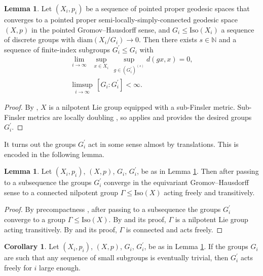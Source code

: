 \documentclass[12pt]{amsart}
\theoremstyle{definition}
\def\fnum{equation}
\newtheorem{corollary}[\fnum]{Corollary}
\newtheorem{lemma}[\fnum]{Lemma}
\numberwithin{equation}{section}
\newcommand{\diam}{{\text {diam}}}
\newcommand{\iso}{\text{Iso}}
\begin{document}
\begin{lemma}\label{lem:almost-homogeoeus-subgroups}
Let  $(X_i, p_i)$ be a sequence of pointed proper geodesic spaces that converges to a pointed proper semi-locally-simply-connected geodesic space $(X,p)$ in the pointed Gromov--Hausdorff sense, and $G_i \leq \iso (X_i)$ a sequence of discrete groups with $\diam (X_i / G_i ) \to 0$. Then there exists $s \in \mathbb{N}$ and a sequence of finite-index subgroups $ G_i  ^{\prime} \leq G_i $ with 
\begin{gather}
 \lim_{i \to \infty }  \, \, \,  \sup _{x \in X_i} \, \sup _{g \in (G_i ^{\prime } ) ^{(s)}}  d(gx, x )   = 0 , \label{eq:gi-nilpotent} \\
   \limsup_{i \to \infty} \, [G_i : G_i ^{\prime}]  < \infty   .  \label{eq:bounded-index}
\end{gather}
 \end{lemma}
\begin{proof}
 By \cite[Theorem 4.1]{zamora-limits}, $X$ is a nilpotent Lie group equipped with a sub-Finsler metric. Sub-Finsler metrics are locally doubling \cite{nagel-stein-wainger}, so  \cite[Remark 3.4]{zamora-limits} applies and \cite[Lemma 3.2]{zamora-limits} provides the desired groups $G_i^{\prime}$.
\end{proof}

It turns out the groups $ G_i^{\prime} $ act in some sense almost by translations. This is encoded in the following lemma.

\begin{lemma}\label{lem:almost-translations}
    Let $(X_i, p_i)$, $(X,p)$, $G_i$, $G_i^{\prime}$, be as in Lemma \ref{lem:almost-homogeoeus-subgroups}. Then after passing to a subsequence the groups $G_i^{\prime}$ converge in the equivariant Gromov--Hausdorff sense to a connected nilpotent group $\Gamma \leq \iso (X)$ acting freely and transitively.  
\end{lemma}

\begin{proof} 
    By precompactness \cite[Proposition 3.6]{fukaya-yamaguchi}, after passing to a subsequence the groups $G_i^{\prime}$ converge to a group $\Gamma \leq \iso (X)$.  By \cite[Theorem 4.1]{zamora-limits} and its proof, $\Gamma$ is a nilpotent Lie group acting transitively. By \cite[Proposition 5.2]{zamora-limits} and its proof, $\Gamma$ is connected and acts freely.
\end{proof}

\begin{corollary}\label{cor:free}
    Let $(X_i, p_i)$, $(X,p)$, $G_i$, $G_i^{\prime}$, be as in Lemma \ref{lem:almost-homogeoeus-subgroups}. If the groups $G_i$ are such that any sequence of small subgroups is eventually trivial, then $G_i^{\prime}$ acts freely for $i$ large enough. 
\end{corollary}
\end{document}
